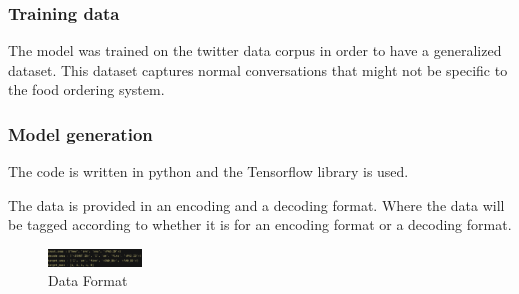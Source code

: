 \documentclass[conference]{IEEEtran}
\begin{document}
\subsubsection{Training data}
The model was trained on the twitter data corpus in order to have a generalized dataset. This dataset captures normal conversations that might not be specific to the food ordering system.

\bigskip

\subsubsection{Model generation}
The code is written in python and the Tensorflow library is used.

The data is provided in an encoding and a decoding format. Where the data will be tagged according to whether it is for an encoding format or a decoding format.

\begin{figure}[!ht]
	\centering
	\includegraphics[width=0.222\textwidth]{data_format.png}
	\caption{Data Format}
\end{figure}
\end{document}
